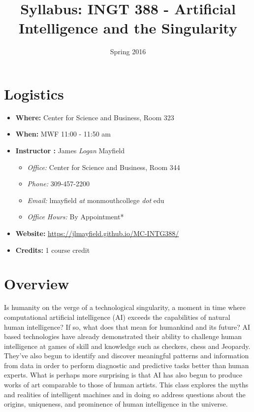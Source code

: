 \documentclass[]{tufte-handout}
\title{Syllabus: INGT 388 - Artificial Intelligence and the Singularity}
\author{}
\date{ Spring 2016 }
\begin{document}
\maketitle

\section{Logistics}
\begin{itemize}
\item \textbf{Where: } Center for Science and Business, Room 323
\item \textbf{When: } MWF 11:00 - 11:50 am
\item \textbf{Instructor :} James \textit{Logan} Mayfield
\begin{itemize}
\item \textit{Office: } Center for Science and Business, Room 344
\item \textit{Phone: } 309-457-2200
\item \textit{Email: } lmayfield \textit{at} monmouthcollege \textit{dot} edu
\item \textit{Office Hours: } By Appointment*
\end{itemize}
\item \textbf{Website: } \url{https://jlmayfield.github.io/MC-INTG388/}
\item \textbf{Credits: } 1 course credit
\end{itemize}

\section{Overview}

Is humanity on the verge of a technological singularity, a moment in time where computational artificial intelligence (AI) exceeds the capabilities of natural human intelligence?  If so, what does that mean for humankind and its future? AI based technologies have already demonstrated their ability to challenge human intelligence at games of skill and knowledge such as checkers, chess and Jeopardy. They've also begun to identify and discover meaningful patterns and information from data in order to perform diagnostic and predictive tasks better than human experts.  What is perhaps more surprising is that AI has also begun to produce works of art comparable to those of human artists. This class explores the myths and realities of intelligent machines and in doing so address questions about the origins, uniqueness, and prominence of human intelligence in the universe.     
\end{document}
